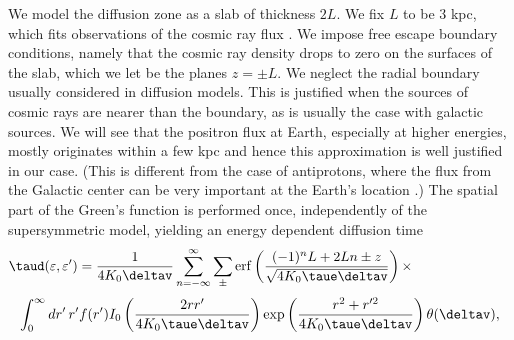 We model the diffusion zone as a slab of thickness $2L$\@.  We fix $L$ to be 3
kpc, which fits observations of the cosmic ray flux \cite{wlg}.  We impose free
escape boundary conditions, namely that the cosmic ray density drops to zero on
the surfaces of the slab, which we let be the planes $z=\pm L$\@.  We neglect
the radial boundary usually considered in diffusion models.  This is justified
when the sources of cosmic rays are nearer than the boundary, as is usually the
case with galactic sources.  We will see that the positron flux at Earth,
especially at higher energies, mostly originates within a few kpc and hence
this approximation is well justified in our case. (This is different from the
case of antiprotons, where the flux from the Galactic center can be very
important at the Earth's location \cite{pbar}.)
The spatial part of the Green's function is performed once, independently of
the supersymmetric model, yielding an energy dependent diffusion time
\begin{equation}
\taud(\varepsilon,\varepsilon')=\frac{1}{4K_0\deltav}
\sum^\infty_{n=-\infty}\sum_\pm\erf\left(\frac{(-1)^nL+2Ln\pm z}
{\sqrt{4K_0\taue\deltav}}\right)\times\hspace{1in}
\end{equation}
\begin{displaymath}
\int_0^\infty dr'\,r'f(r')
I_0\left(\frac{2rr'}{4K_0\taue\deltav}\right)
\exp\left(\frac{r^2+r'^2}{4K_0\taue\deltav}\right)
\theta(\deltav),
\end{displaymath}
